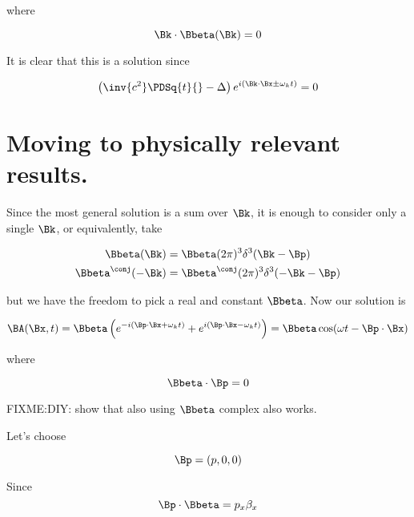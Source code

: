 where

\begin{equation}\label{eqn:relativisticElectrodynamicsL16:70}
\Bk \cdot \Bbeta(\Bk) = 0
\end{equation}

It is clear that this is a solution since

\begin{equation}\label{eqn:relativisticElectrodynamicsL16:90}
\left( \inv{c^2} \PDSq{t}{} - \Delta \right) e^{i (\Bk \cdot \Bx \pm \omega_k t)} = 0
\end{equation}

\section{Moving to physically relevant results.}

Since the most general solution is a sum over $\Bk$, it is enough to consider only a single $\Bk$, or equivalently, take

\begin{align}\label{eqn:relativisticElectrodynamicsL16:110}
\Bbeta(\Bk) &= \Bbeta ( 2\pi)^3 \delta^3(\Bk - \Bp) \\
\Bbeta^\conj(-\Bk) &= \Bbeta^\conj ( 2\pi)^3 \delta^3(-\Bk - \Bp)
\end{align}

but we have the freedom to pick a real and constant $\Bbeta$.  Now our solution is

\begin{equation}\label{eqn:relativisticElectrodynamicsL16:130}
\BA(\Bx, t) = \Bbeta \left(
e^{-i (\Bp \cdot \Bx + \omega_k t)}
+e^{i (\Bp \cdot \Bx - \omega_k t)}
\right)
= \Bbeta \cos( \omega t - \Bp \cdot \Bx)
\end{equation}

where

\begin{equation}\label{eqn:relativisticElectrodynamicsL16:150}
\Bbeta \cdot \Bp = 0
\end{equation}

FIXME:DIY: show that also using $\Bbeta$ complex also works.

Let's choose

\begin{equation}\label{eqn:relativisticElectrodynamicsL16:170}
\Bp = (p, 0, 0)
\end{equation}

Since
\begin{equation}\label{eqn:relativisticElectrodynamicsL16:190}
\Bp \cdot \Bbeta = p_x \beta_x
\end{equation}

